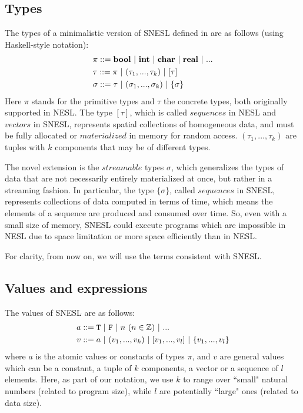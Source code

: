 \subsection{Types}

The types of a minimalistic version of SNESL defined in \cite{MadFil13} are as follows (using Haskell-style notation):
\begin{align*} 
& \pi ::= \bool \ | \ \int \ | \ \*{char} \ | \ \*{real}  \ | \ ...  \\
& \tau ::= \pi \ | \ (\tau_1,...,\tau_k) \ | \ [\tau]  \\
& \sigma ::= \tau \ | \ (\sigma_1,...,\sigma_k) \ | \ \tseq{\sigma}  
\end{align*}
Here $\pi$ stands for the primitive types and $\tau$ the concrete types, both originally supported in NESL.
The type $[\tau]$, which is called $sequences$ in NESL and $vectors$ in SNESL, represents spatial collections of homogeneous data, and must be
fully allocated or $materialized$ in memory for random access.  
$(\tau_1,...,\tau_k)$ are tuples with $k$ components that may be of different types.

The novel extension is the $streamable$ types $\sigma$, which generalizes the types of data that are not necessarily entirely materialized at once, but rather in a streaming fashion. 
In particular, the type $\{\sigma\}$, called $sequences$ in SNESL, represents collections of data computed in terms of time, which means the elements of a sequence are produced and consumed over time.
So, even with a small size of memory, SNESL could execute programs which are impossible in NESL due to space limitation or more space efficiently than in NESL. 

For clarity, from now on, we will use the terms consistent with SNESL.

\subsection{Values and expressions}

The values of SNESL are as follows:
\begin{align*}
& a ::=  \T \ | \ \F \ | \ n \ (n \in \mathbb{Z}) \ | \ ... \\
& v ::=  a \ | \ (v_1,...,v_k) \ | \ [v_1,...,v_l] \ | \ \{v_1,...,v_l\} 
\end{align*}
where $a$ is the atomic values or constants of types $\pi$, and $v$ are
 general values which can be a constant, a tuple of $k$ components, a vector or a sequence of $l$ elements. 
Here, as part of our notation, we use $k$ to range over ``small" natural numbers (related to program size), while $l$ are potentially ``large" ones (related to data size). 


